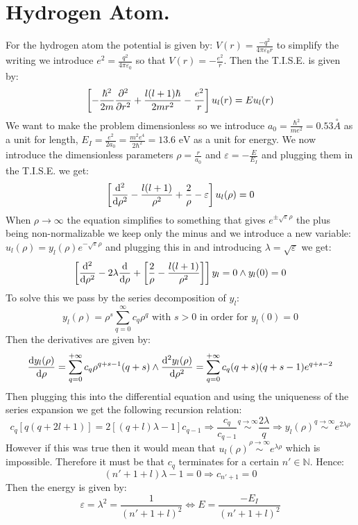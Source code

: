 \documentclass[10pt,a4paper]{book}
\begin{document}
\section{Hydrogen Atom.}
For the hydrogen atom the potential is given by: $V(r) = \frac{-q^2}{4\pi \varepsilon_0 r}$ to simplify the writing we introduce $e^2 = \frac{q^2}{4 \pi \varepsilon_0}$ so that $V(r) = - \frac{e^2}{r}$. Then the T.I.S.E. is given by:
\[
\left[ -\frac{\hbar^2}{2m} \pdv[2]{}{r} + \frac{l ( l + 1) \hbar}{2 m r^2} - \frac{e^2}{r} \right] u_l(r) = E u_l(r)
\]
We want to make the problem dimensionless so we introduce $a_0 = \frac{\hbar^2}{m e^2}= 0.53 \stackrel{\circ}{A}$ as a unit for length, $E_I = \frac{e^2}{2 a_0} = \frac{m^2 e^4}{2 \hbar^2} = 13.6 \text{ eV} $ as a unit for energy. We now introduce the dimensionless parameters $\rho = \frac{r}{a_0}$ and $\varepsilon = -\frac{E}{E_I}$ and plugging them in the T.I.S.E. we get:
\[
\left[ \dv[2]{}{\rho} - \frac{l(l+1)}{\rho^2} + \frac{2}{\rho} - \varepsilon \right] u_l(\rho) = 0
\]
When $\rho \to \infty$ the equation simplifies to something that gives $e^{\pm \sqrt{\varepsilon} \rho}$ the plus being non-normalizable we keep only the minus and we introduce a new variable: $u_l(\rho) = y_l(\rho) e^{-\sqrt{\varepsilon} \rho}$ and plugging this in and introducing $\lambda = \sqrt{\varepsilon}$ we get:
\[
\left[ \dv[2]{}{\rho} - 2\lambda \dv{}{\rho} + \left[\frac{2}{\rho} - \frac{l (l + 1)}{\rho^2} \right] \right] y_l = 0 \land y_l(0) = 0
\]
To solve this we pass by the series decomposition of $y_l$:
\[
y_l(\rho) = \rho^s \sum_{q = 0}^{\infty} c_q \rho^q \text{ with } s > 0 \text{ in order for } y_l(0) = 0
\]
Then the derivatives are given by:
\[
\dv{y_l(\rho)}{\rho} = \sum_{q = 0}^{+\infty} c_q \rho^{q + s - 1} (q + s) \land \dv[2]{y_l(\rho)}{\rho} = \sum_{q = 0}^{+\infty} c_q (q + s) (q + s - 1) e^{q + s - 2}
\]
Then plugging this into the differential equation and using the uniqueness of the series expansion we get the following recursion relation:
\[
c_q \left[ q (q + 2l + 1) \right] = 2 \left[(q+l)\lambda - 1 \right] c_{q-1} \Rightarrow \frac{c_q}{c_{q-1}} \stackrel{q \to \infty}{\sim} \frac{2\lambda}{q} \Rightarrow y_l(\rho) \stackrel{q \to \infty}{\sim} e^{2\lambda \rho}
\]
However if this was true then it would mean that $u_l(\rho) \stackrel{\rho \to \infty}{\sim} e^{\lambda \rho}$ which is impossible. Therefore it must be that $c_q$ terminates for a certain $n' \in \mathbb{N}$. Hence:
\[
(n' + 1 + l) \lambda - 1 = 0 \Rightarrow c_{n'+1} = 0
\]
Then the energy is given by:
\[
\varepsilon = \lambda^2 = \frac{1}{(n' + 1 + l)^2} \Leftrightarrow E = \frac{-E_I}{(n' + 1 + l)^2}
\]
\end{document}
